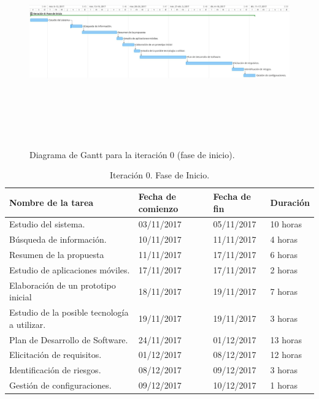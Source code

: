 \documentclass[twoside]{report}
\begin{document}
\begin{figure}[H]
\begin{center}
\includegraphics[height=9cm, width=\textwidth]{images/gantt/ite0}
\caption{Diagrama de Gantt para la iteración 0 (fase de inicio).}
\end{center}
\end{figure}

\begin{table}[H]
\centering
	\begin{tabular}{|l|l|l|l|}
    \hline
    Nombre de la tarea                           & Fecha de comienzo & Fecha de fin & Duración \\ \hline
    Estudio del sistema.                         & 03/11/2017        & 05/11/2017   & 10 horas  \\ \hline
    Búsqueda de información.                     & 10/11/2017        & 11/11/2017   & 4 horas   \\ \hline
    Resumen de la propuesta                      & 11/11/2017        & 17/11/2017   & 6 horas   \\ \hline
    Estudio de aplicaciones móviles.             & 17/11/2017        & 17/11/2017   & 2 horas   \\ \hline
    Elaboración de un prototipo inicial          & 18/11/2017        & 19/11/2017   & 7 horas   \\ \hline
    Estudio de la posible tecnología a utilizar. & 19/11/2017        & 19/11/2017   & 3 horas   \\ \hline
    Plan de Desarrollo de Software.              & 24/11/2017        & 01/12/2017   & 13 horas   \\ \hline
    Elicitación de requisitos.                   & 01/12/2017        & 08/12/2017   & 12 horas   \\ \hline
    Identificación de riesgos.                   & 08/12/2017        & 09/12/2017   & 3 horas   \\ \hline
    Gestión de configuraciones.                  & 09/12/2017        & 10/12/2017   & 1 horas   \\ \hline
    \end{tabular}
    \caption{Iteración 0. Fase de Inicio.}
\end{table}
\end{document}
